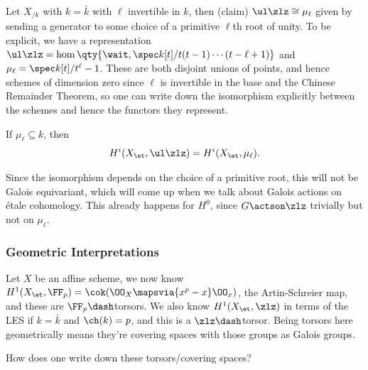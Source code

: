 \begin{example}[?]

Let \(X_{/k}\) with \(k=\bar k\) with \(\ell\) invertible in \(k\), then
(claim) \(\ul \zlz \cong \mu_\ell\) given by sending a generator to some
choice of a primitive \(\ell\)th root of unity. To be explicit, we have
a representation
\(\ul \zlz = \hom \qty{ \wait, \spec k[t] / t(t-1) \cdots (t-\ell+1) }\)
and \(\mu_\ell = \spec k[t] / t^\ell-1\). These are both disjoint unions
of points, and hence schemes of dimension zero since \(\ell\) is
invertible in the base and the Chinese Remainder Theorem, so one can
write down the isomorphism explicitly between the schemes and hence the
functors they represent.

\begin{corollary}[?]

If \(\mu_\ell \subseteq k\), then
\begin{align*}  
H^i(X_\et, \ul\zlz) = 
H^i(X_\et, \mu_\ell)
.\end{align*}

\end{corollary}

Since the isomorphism depends on the choice of a primitive root, this
will not be Galois equivariant, which will come up when we talk about
Galois actions on étale cohomology. This already happens for \(H^0\),
since \(G\actson\zlz\) trivially but not on \(\mu_\ell\).

\end{example}

\hypertarget{geometric-interpretations}{%
\subsubsection{Geometric
Interpretations}\label{geometric-interpretations}}

Let \(X\) be an affine scheme, we now know
\(H^1(X_\et, \FF_p) = \cok(\OO_X \mapsvia{x^p - x} \OO_x)\), the
Artin-Schreier map, and these are \(\FF_p\dash\)torsors. We also know
\(H^1(X_\et, \zlz)\) in terms of the LES if \(k = \bar k\) and
\(\ch(k) = p\), and this is a \(\zlz\dash\)torsor. Being torsors here
geometrically means they're covering spaces with those groups as Galois
groups.

\begin{question}

How does one write down these torsors/covering spaces?

\end{question}

